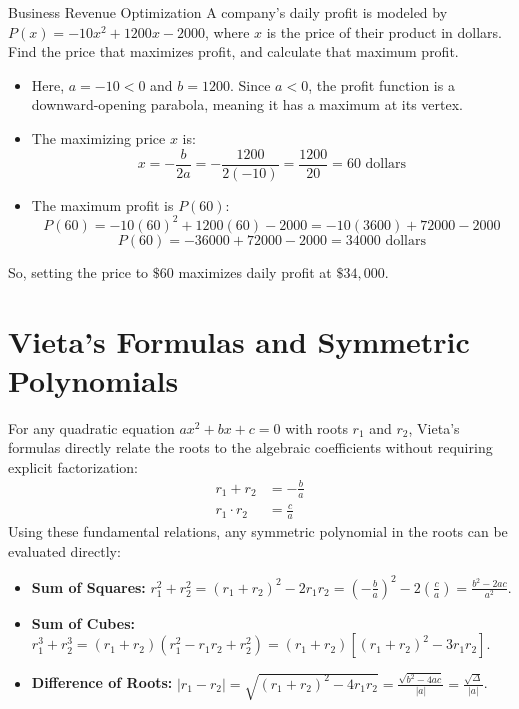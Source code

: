 \begin{examplebox}{Business Revenue Optimization}
A company's daily profit is modeled by $P(x) = -10x^2 + 1200x - 2000$, where $x$ is the price of their product in dollars. Find the price that maximizes profit, and calculate that maximum profit.
\begin{itemize}
    \item Here, $a = -10 < 0$ and $b = 1200$. Since $a < 0$, the profit function is a downward-opening parabola, meaning it has a maximum at its vertex.
    \item The maximizing price $x$ is:
    $$x = -\frac{b}{2a} = -\frac{1200}{2(-10)} = \frac{1200}{20} = 60 \text{ dollars}$$
    \item The maximum profit is $P(60)$:
    $$P(60) = -10(60)^2 + 1200(60) - 2000 = -10(3600) + 72000 - 2000$$
    $$P(60) = -36000 + 72000 - 2000 = 34000 \text{ dollars}$$
\end{itemize}
So, setting the price to $\$60$ maximizes daily profit at $\$34,000$.
\end{examplebox}

\section{Vieta's Formulas and Symmetric Polynomials}

For any quadratic equation $a x^2 + b x + c = 0$ with roots $r_1$ and $r_2$, Vieta's formulas directly relate the roots to the algebraic coefficients without requiring explicit factorization:
\begin{align*}
    r_1 + r_2 &= -\frac{b}{a} \\
    r_1 \cdot r_2 &= \frac{c}{a}
\end{align*}
Using these fundamental relations, any symmetric polynomial in the roots can be evaluated directly:
\begin{itemize}
    \item \textbf{Sum of Squares:} $r_1^2 + r_2^2 = (r_1 + r_2)^2 - 2 r_1 r_2 = \left(-\frac{b}{a}\right)^2 - 2\left(\frac{c}{a}\right) = \frac{b^2 - 2ac}{a^2}$.
    \item \textbf{Sum of Cubes:} $r_1^3 + r_2^3 = (r_1 + r_2)(r_1^2 - r_1 r_2 + r_2^2) = (r_1 + r_2)\left[(r_1 + r_2)^2 - 3 r_1 r_2\right]$.
    \item \textbf{Difference of Roots:} $|r_1 - r_2| = \sqrt{(r_1 + r_2)^2 - 4 r_1 r_2} = \frac{\sqrt{b^2 - 4ac}}{|a|} = \frac{\sqrt{\Delta}}{|a|}$.
\end{itemize}

